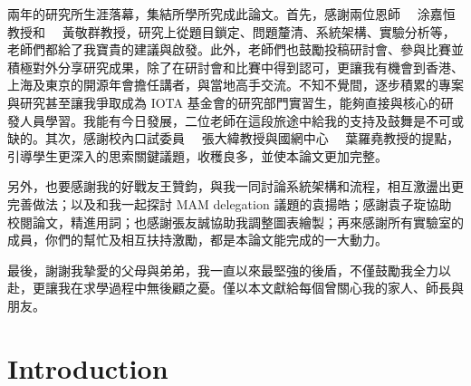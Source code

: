 \begin{spacing}{2.0}

兩年的研究所生涯落幕，集結所學所究成此論文。首先，感謝兩位恩師 \ \ 涂嘉恒教授和 \ \ 黃敬群教授，研究上從題目鎖定、問題釐清、系統架構、實驗分析等，老師們都給了我寶貴的建議與啟發。此外，老師們也鼓勵投稿研討會、參與比賽並積極對外分享研究成果，除了在研討會和比賽中得到認可，更讓我有機會到香港、上海及東京的開源年會擔任講者，與當地高手交流。不知不覺間，逐步積累的專案與研究甚至讓我爭取成為 IOTA 基金會的研究部門實習生，能夠直接與核心的研發人員學習。我能有今日發展，二位老師在這段旅途中給我的支持及鼓舞是不可或缺的。其次，感謝校內口試委員 \ \ 張大緯教授與國網中心 \ \ 葉羅堯教授的提點，引導學生更深入的思索關鍵議題，收穫良多，並使本論文更加完整。

另外，也要感謝我的好戰友王贊鈞，與我一同討論系統架構和流程，相互激盪出更完善做法；以及和我一起探討 MAM delegation 議題的袁揚皓；感謝袁子琁協助校閱論文，精進用詞；也感謝張友誠協助我調整圖表繪製；再來感謝所有實驗室的成員，你們的幫忙及相互扶持激勵，都是本論文能完成的一大動力。

最後，謝謝我摯愛的父母與弟弟，我一直以來最堅強的後盾，不僅鼓勵我全力以赴，更讓我在求學過程中無後顧之憂。僅以本文獻給每個曾關心我的家人、師長與朋友。

\end{spacing}

\clearpage
{}



\renewcommand*\contentsname{Table of Contents}
\singlespacing
\newpage
{}
\pagestyle{plain}
\tableofcontents
\clearpage
{}

\listoftables
\listoffigures

\setcounter{page}{1}
\newpage
{}
\chapter{Introduction}
\pagestyle{plain}

